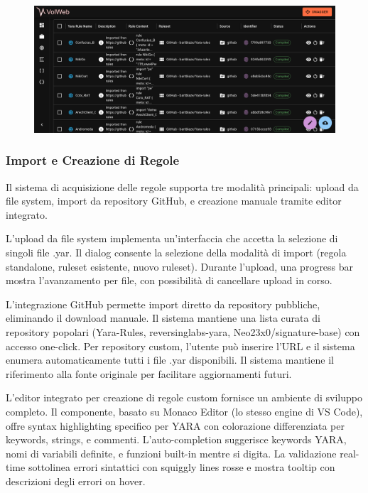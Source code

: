 \begin{figure}[H]
\centering
\includegraphics[width=1\linewidth]{images/volweb-esteso/volweb-rulelist.png}
\end{figure}

\subsubsection{Import e Creazione di Regole}

Il sistema di acquisizione delle regole supporta tre modalità principali: upload da file system, import da repository GitHub, e creazione manuale tramite editor integrato.

L'upload da file system implementa un'interfaccia che accetta la selezione di singoli file .yar. Il dialog consente la selezione della modalità di import (regola standalone, ruleset esistente, nuovo ruleset). Durante l'upload, una progress bar mostra l'avanzamento per file, con possibilità di cancellare upload in corso.

L'integrazione GitHub permette import diretto da repository pubbliche, eliminando il download manuale. Il sistema mantiene una lista curata di repository popolari (Yara-Rules, reversinglabs-yara, Neo23x0/signature-base) con accesso one-click. Per repository custom, l'utente può inserire l'URL e il sistema enumera automaticamente tutti i file .yar disponibili. Il sistema mantiene il riferimento alla fonte originale per facilitare aggiornamenti futuri.

L'editor integrato per creazione di regole custom fornisce un ambiente di sviluppo completo. Il componente, basato su Monaco Editor (lo stesso engine di VS Code), offre syntax highlighting specifico per YARA con colorazione differenziata per keywords, strings, e commenti. L'auto-completion suggerisce keywords YARA, nomi di variabili definite, e funzioni built-in mentre si digita. La validazione real-time sottolinea errori sintattici con squiggly lines rosse e mostra tooltip con descrizioni degli errori on hover.

